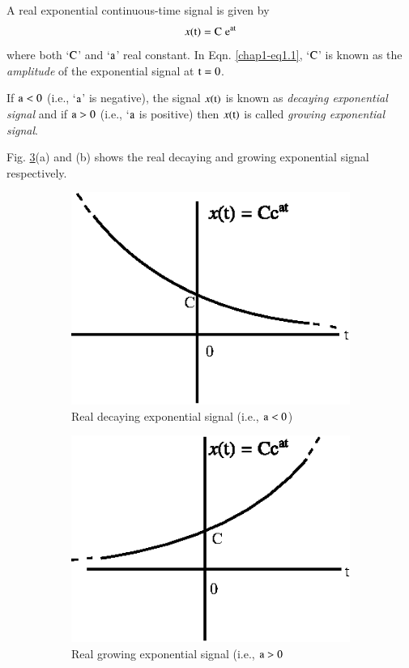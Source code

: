 A real exponential continuous-time signal is given by
\begin{equation}
x(\textrm{t})=\textrm{C}\; \textrm{e}^{\textrm{at}}\label{chap1-eq1.1}
\end{equation}
where both `$\textrm{C}$' and `$\textrm{a}$' real constant. In Eqn. \eqref{chap1-eq1.1}, `$\textrm{C}$' is known as the {\em amplitude} of the exponential signal at $\textrm{t}=0$.

If $\textrm{a}<0$ (i.e., `$\textrm{a}$' is negative), the signal $x(\textrm{t})$ is known as {\em decaying exponential signal} and if $\textrm{a}>0$ (i.e., `$\textrm{a}$ is positive) then $x(\textrm{t})$ is called {\em growing exponential signal}.

Fig. \ref{chap1-fig1.8}(a) and (b) shows the real decaying and growing exponential signal respectively.

\begin{figure}[t!]
\centering

\begin{subfigure}[t]{0.4\textwidth}
\centering
\includegraphics{src/chap1/fig9a.eps}
\caption{Real decaying exponential signal (i.e., $\textrm{a}<0$)}\label{chap1-fig1.8a}
\end{subfigure}
\qquad
\begin{subfigure}[t]{0.4\textwidth}
\centering
\includegraphics{src/chap1/fig9b.eps}
\caption{Real growing exponential signal (i.e., $\textrm{a}>0$}\label{chap1-fig1.8b}
\end{subfigure}
\caption{}\label{chap1-fig1.8}
\end{figure}


